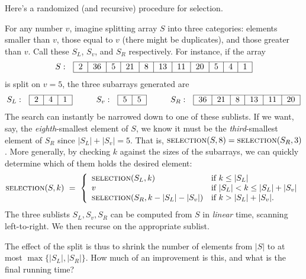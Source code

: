 Here's a randomized (and recursive) procedure for selection.

For any number $v$, imagine splitting array $S$ into three categories: 
elements smaller than $v$, those equal to $v$ (there might be duplicates), 
and those greater than $v$. Call these $S_L$, $S_v$, and $S_R$ respectively. 
For instance, if the array
$$ S :\ \ \begin{tabular}{|c|c|c|c|c|c|c|c|c|c|c|} \hline
2 & 36 & 5 & 21 & 8 & 13 & 11 & 20 & 5 & 4 & 1\\ \hline
\end{tabular}$$
is split on $v = 5$, the three subarrays generated are
$$ 
S_L :\ \  \begin{tabular}{|c|c|c|} \hline 2 & 4 & 1 \\ \hline \end{tabular} 
\hskip.4in 
S_{v} :\ \ \begin{tabular}{|c|c|} \hline 5 & 5 \\ \hline \end{tabular} 
\hskip.4in 
S_{R} :\ \ \begin{tabular}{|c|c|c|c|c|c|} \hline 36 & 21 & 8 & 13 & 11 & 20 \\ \hline
\end{tabular} 
$$
The search can instantly be narrowed down to one of these sublists. If we want, say, 
the {\it eighth}-smallest element of $S$, we know it must be the {\it third}-smallest 
element of $S_R$ since $|S_L| + |S_v| = 5$.
That is, $\mbox{\sc selection}(S, 8) = \mbox{\sc selection}(S_R,3)$.
More generally, by checking $k$ against the sizes of the subarrays, 
we can quickly determine which of them holds the desired element:
$$ 
\mbox{\sc selection}(S,k) 
\ = \ 
\left\{ \begin{array}{ll}
\mbox{\sc selection}(S_{L},k) & \mbox{if $k \leq |S_{L}|$} \\ 
v                             & \mbox{if $|S_{L}| < k \leq |S_{L}| + |S_{v}|$} \\
\mbox{\sc selection}(S_{R}, k - |S_{L}| - |S_{v}|) & \mbox{if $k > |S_{L}| + |S_{v}|$} .
\end{array} \right.
$$
The three sublists $S_{L}, S_{v}, S_{R}$ can be computed from $S$ in {\it linear} 
time, scanning left-to-right. We then recurse on the appropriate sublist. 

The effect of the split is thus to shrink the number of elements from $|S|$ to 
at most $\max\{|S_{L}|, |S_{R}|\}$. How much of an improvement is this, and 
what is the final running time?


